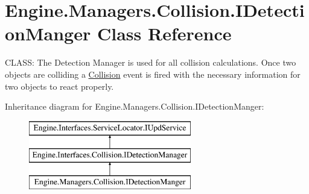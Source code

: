 \hypertarget{a00502}{}\section{Engine.\+Managers.\+Collision.\+I\+Detection\+Manger Class Reference}
\label{a00502}


C\+L\+A\+SS\+: The Detection Manager is used for all collision calculations. Once two objects are colliding a \hyperlink{a00268}{Collision} event is fired with the necessary information for two objects to react properly.  


Inheritance diagram for Engine.\+Managers.\+Collision.\+I\+Detection\+Manger\+:\begin{figure}[H]
\begin{center}
\leavevmode
\includegraphics[height=3.000000cm]{d0/da2/a00502}
\end{center}
\end{figure}
